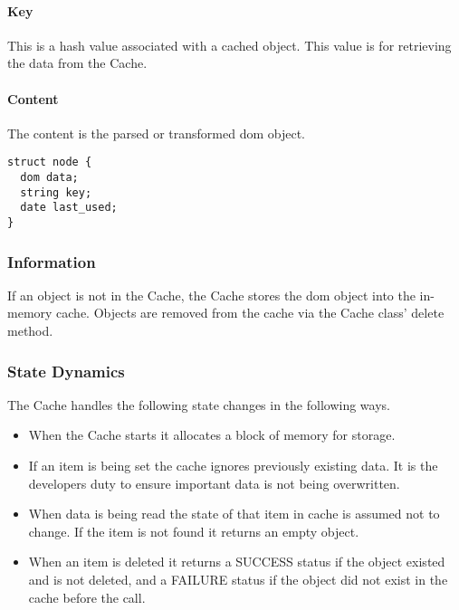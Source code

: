 \paragraph{Key}
This is a hash value associated with a cached object.
This value is for retrieving the data from the Cache.

\paragraph{Content}
The content is the parsed or transformed \gls{dom} object.

\begin{lstlisting}
struct node {
  dom data;
  string key;
  date last_used;
}
\end{lstlisting}

\subsubsection{Information}

If an object is not in the Cache, the Cache stores the \gls{dom} object into the in-memory cache. 
Objects are removed from the cache via the Cache class' delete method.

\subsubsection{State Dynamics}

The Cache handles the following state changes in the following ways.

\begin{itemize}
    \item {
      When the Cache starts it allocates a block of memory for storage.
     }
    \item {
      If an item is being set the cache ignores previously existing data.
      It is the developers duty to ensure important data is not being overwritten.
    }
    \item {
      When data is being read the state of that item in cache is assumed not to change.
      If the item is not found it returns an empty object.
    }
    \item  When an item is deleted it returns a SUCCESS status if the object existed and is not deleted, and a FAILURE status if the object did not exist in the cache before the call.
\end{itemize}

